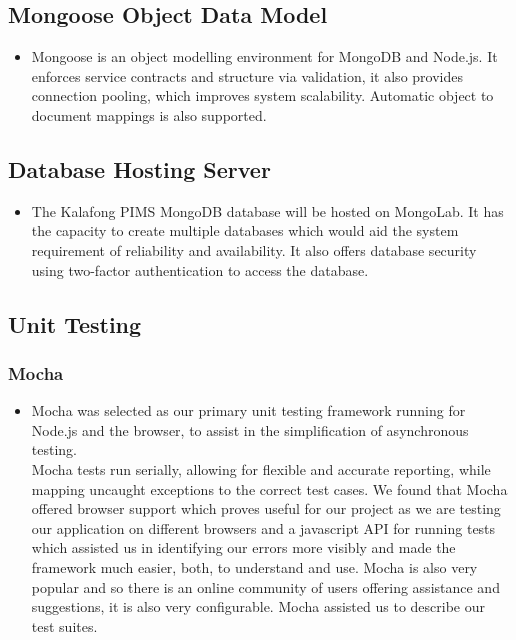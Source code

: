 \subsection{Mongoose Object Data Model}
\begin{itemize}
	\item Mongoose is an object modelling environment for MongoDB and Node.js. It enforces service contracts and structure via validation, it also provides connection pooling, which improves system scalability. Automatic object to document mappings is also supported.
\end{itemize}

\subsection{Database Hosting Server}
\begin{itemize}
	\item The Kalafong PIMS MongoDB database will be hosted on MongoLab. It has the capacity to create multiple databases which would aid the system requirement of reliability and availability. It also offers database security using two-factor authentication to access the database.
\end{itemize}

\subsection{Unit Testing}
\subsubsection{Mocha}
\begin{itemize}
	\item Mocha was selected as our primary unit testing framework running for Node.js and the browser,
to assist in the simplification of asynchronous testing. \\
	Mocha tests run serially, allowing for flexible and accurate reporting, while mapping uncaught exceptions to the correct test 
 cases. We found that Mocha offered browser support which proves useful for our project as we are testing
our application on different browsers and a javascript API for running tests which assisted us in identifying our 
errors more visibly and made the framework much easier, both, to understand and use. Mocha is also very popular and 
so there is an online community of users offering assistance and suggestions, it is also very configurable. 
Mocha assisted us to describe our test suites.
\end{itemize}

